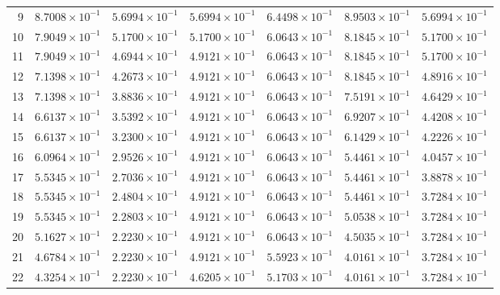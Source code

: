 \begin{table}[H]
\begin{tabular}{@{}rrrrrrr@{}}
9 & $8.7008\times10^{-1}$ & $5.6994\times10^{-1}$ & $5.6994\times10^{-1}$ & $6.4498\times10^{-1}$ & $8.9503\times10^{-1}$ & $5.6994\times10^{-1}$\\
10 & $7.9049\times10^{-1}$ & $5.1700\times10^{-1}$ & $5.1700\times10^{-1}$ & $6.0643\times10^{-1}$ & $8.1845\times10^{-1}$ & $5.1700\times10^{-1}$\\
11 & $7.9049\times10^{-1}$ & $4.6944\times10^{-1}$ & $4.9121\times10^{-1}$ & $6.0643\times10^{-1}$ & $8.1845\times10^{-1}$ & $5.1700\times10^{-1}$\\
12 & $7.1398\times10^{-1}$ & $4.2673\times10^{-1}$ & $4.9121\times10^{-1}$ & $6.0643\times10^{-1}$ & $8.1845\times10^{-1}$ & $4.8916\times10^{-1}$\\
13 & $7.1398\times10^{-1}$ & $3.8836\times10^{-1}$ & $4.9121\times10^{-1}$ & $6.0643\times10^{-1}$ & $7.5191\times10^{-1}$ & $4.6429\times10^{-1}$\\
14 & $6.6137\times10^{-1}$ & $3.5392\times10^{-1}$ & $4.9121\times10^{-1}$ & $6.0643\times10^{-1}$ & $6.9207\times10^{-1}$ & $4.4208\times10^{-1}$\\
15 & $6.6137\times10^{-1}$ & $3.2300\times10^{-1}$ & $4.9121\times10^{-1}$ & $6.0643\times10^{-1}$ & $6.1429\times10^{-1}$ & $4.2226\times10^{-1}$\\
16 & $6.0964\times10^{-1}$ & $2.9526\times10^{-1}$ & $4.9121\times10^{-1}$ & $6.0643\times10^{-1}$ & $5.4461\times10^{-1}$ & $4.0457\times10^{-1}$\\
17 & $5.5345\times10^{-1}$ & $2.7036\times10^{-1}$ & $4.9121\times10^{-1}$ & $6.0643\times10^{-1}$ & $5.4461\times10^{-1}$ & $3.8878\times10^{-1}$\\
18 & $5.5345\times10^{-1}$ & $2.4804\times10^{-1}$ & $4.9121\times10^{-1}$ & $6.0643\times10^{-1}$ & $5.4461\times10^{-1}$ & $3.7284\times10^{-1}$\\
19 & $5.5345\times10^{-1}$ & $2.2803\times10^{-1}$ & $4.9121\times10^{-1}$ & $6.0643\times10^{-1}$ & $5.0538\times10^{-1}$ & $3.7284\times10^{-1}$\\
20 & $5.1627\times10^{-1}$ & $2.2230\times10^{-1}$ & $4.9121\times10^{-1}$ & $6.0643\times10^{-1}$ & $4.5035\times10^{-1}$ & $3.7284\times10^{-1}$\\
21 & $4.6784\times10^{-1}$ & $2.2230\times10^{-1}$ & $4.9121\times10^{-1}$ & $5.5923\times10^{-1}$ & $4.0161\times10^{-1}$ & $3.7284\times10^{-1}$\\
22 & $4.3254\times10^{-1}$ & $2.2230\times10^{-1}$ & $4.6205\times10^{-1}$ & $5.1703\times10^{-1}$ & $4.0161\times10^{-1}$ & $3.7284\times10^{-1}$\\

\end{tabular}
\end{table}
